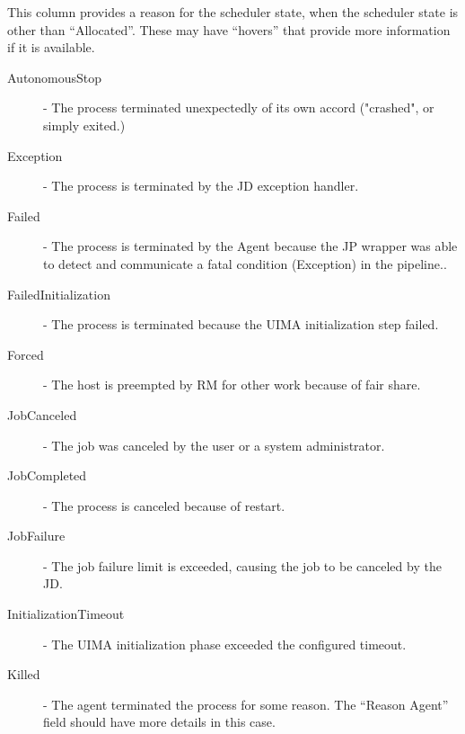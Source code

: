 \begin{description}
          This column provides a reason for the scheduler state, when the scheduler state is other than ``Allocated''. 
          These may have ``hovers'' that provide more information
          if it is available.

            \begin{description}          
                \item[AutonomousStop] - The process terminated unexpectedly of its own accord ("crashed", or
                  simply exited.) 

                \item[Exception] - The process is terminated by the JD exception handler. 

                \item[Failed] - The process is terminated by the Agent because the JP wrapper was able to detect and 
                  communicate a fatal condition (Exception) in the pipeline.. 
                  
                \item[FailedInitialization] - The process is terminated because the UIMA initialization step failed. 
                  
                \item[Forced] - The host is preempted by RM for other work because of fair share. 
                  
                \item[JobCanceled] - The job was canceled by the user or a system administrator. 
                  
                \item[JobCompleted] - The process is canceled because of {\DUCC} restart. 
                  
                \item[JobFailure] - The job failure limit is exceeded, causing the job to be canceled by the JD.                    
                  
                \item[InitializationTimeout] - The UIMA initialization phase exceeded the configured timeout. 
                  
                \item[Killed] - The agent terminated the process for some reason. The ``Reason Agent'' field
                  should have more details in this case.
          

\end{description}
\end{description}
